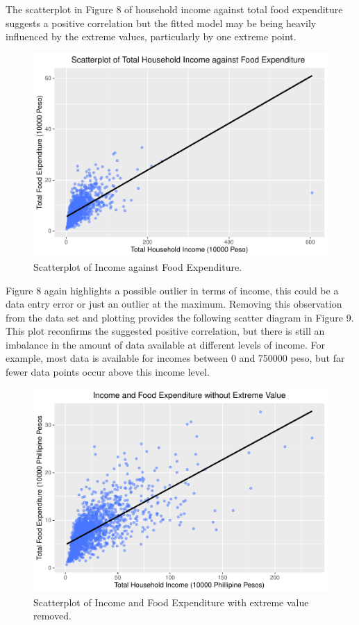 \documentclass[
]{article}
\begin{document}
The scatterplot in Figure 8 of household income against total food
expenditure suggests a positive correlation but the fitted model may be
being heavily influenced by the extreme values, particularly by one
extreme point.

\begin{figure}[H]

{\centering \includegraphics[width=0.8\linewidth]{Group_01_Project2_demo_files/figure-latex/balance_plot-1} 

}

\caption{Scatterplot of Income against Food Expenditure.}\label{fig:balance_plot}
\end{figure}

Figure 8 again highlights a possible outlier in terms of income, this
could be a data entry error or just an outlier at the maximum. Removing
this observation from the data set and plotting provides the following
scatter diagram in Figure 9. This plot reconfirms the suggested positive
correlation, but there is still an imbalance in the amount of data
available at different levels of income. For example, most data is
available for incomes between 0 and 750000 peso, but far fewer data
points occur above this income level.

\begin{figure}[H]

{\centering \includegraphics[width=0.8\linewidth]{Group_01_Project2_demo_files/figure-latex/balance without outlier-1} 

}

\caption{Scatterplot of Income and Food Expenditure with extreme value removed.}\label{fig:balance without outlier}
\end{figure}
\end{document}
